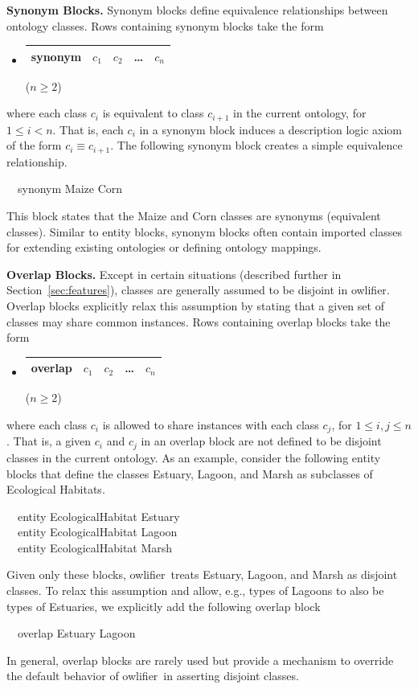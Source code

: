 \documentclass[5p,authoryear]{elsarticle}
\newcommand{\owlifier}{\textsf{owlifier}}
\newcommand{\myblock}[1]{\vspace{12pt}\noindent\textbf{#1}}
\newcommand{\secref}[1]{Section~\ref{#1}}
\begin{document}
\myblock{Synonym Blocks.} Synonym blocks define equivalence
relationships between ontology classes.  Rows containing synonym
blocks take the form
\begin{itemize}
\item[] 
  \begin{tabular}{|l|l|l|l|l|}\hline
    \textsf{synonym} & $c_1$ & $c_2$ & \dots & $c_n$ \\ \hline 
  \end{tabular} \hfill ($n \ge 2$)
\end{itemize}
where each class $c_i$ is equivalent to class $c_{i+1}$ in the current
ontology, for $1 \le i < n$. That is, each $c_i$ in a synonym block
induces a description logic axiom of the form $c_i \equiv
c_{i+1}$. The following synonym block creates a simple equivalence
relationship.
\begin{tabbing}
  ~~\textsf{synonym} \textsf{Maize} \textsf{Corn}
\end{tabbing}
This block states that the Maize and Corn classes are synonyms
(equivalent classes). Similar to entity blocks, synonym blocks often
contain imported classes for extending existing ontologies or defining
ontology mappings.


\myblock{Overlap Blocks.} Except in certain situations (described
further in \secref{sec:features}), classes are generally
assumed to be disjoint in \owlifier.  Overlap blocks explicitly relax this assumption by
stating that a given set of classes may share common instances. Rows containing overlap blocks take the form
\begin{itemize}
\item[]
  \begin{tabular}{|l|l|l|l|l|}\hline
    \textsf{overlap} & $c_1$ & $c_2$ & \dots & $c_n$ \\ \hline 
  \end{tabular} \hfill ($n \ge 2$)
\end{itemize}
where each class $c_i$ is allowed to share instances with each class
$c_j$, for $1 \le i,j \le n$. That is, a given $c_i$ and $c_j$ in an
overlap block are not defined to be disjoint classes in the current
ontology. As an example, consider the following entity blocks that
define the classes Estuary, Lagoon, and Marsh as subclasses of
Ecological Habitats.
\begin{tabbing}
  ~~\textsf{entity} \textsf{EcologicalHabitat} \textsf{Estuary} \\ 
  ~~\textsf{entity} \textsf{EcologicalHabitat} \textsf{Lagoon} \\ 
  ~~\textsf{entity} \textsf{EcologicalHabitat} \textsf{Marsh} 
\end{tabbing}
Given only these blocks, \owlifier\ treats Estuary, Lagoon, and Marsh
as disjoint classes. To relax this assumption and allow, e.g., types
of Lagoons to also be types of Estuaries, we explicitly add the
following overlap block
\begin{tabbing}
  ~~\textsf{overlap} \textsf{Estuary} \textsf{Lagoon}
\end{tabbing}
In general, overlap blocks are rarely used but provide a mechanism to
override the default behavior of \owlifier\ in asserting disjoint
classes.
\end{document}
